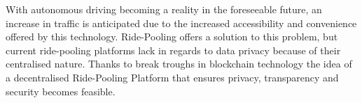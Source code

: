 With autonomous driving becoming a reality in the foreseeable future, an increase in traffic is anticipated due to the increased accessibility and convenience offered by this technology. Ride-Pooling offers a solution to this problem, but current ride-pooling platforms lack in regards to data privacy because of their centralised nature. Thanks to break troughs in blockchain technology the idea of a decentralised Ride-Pooling Platform that ensures privacy, transparency and security becomes feasible. 